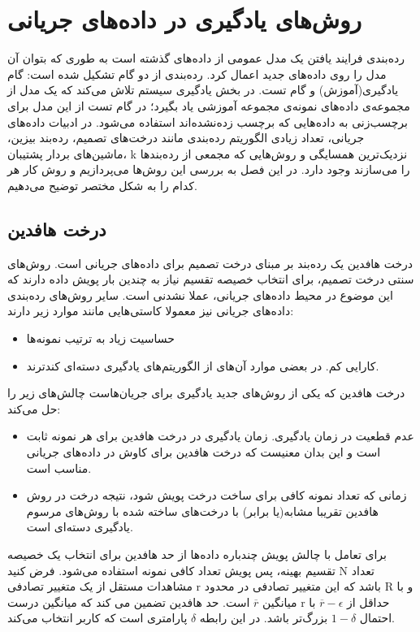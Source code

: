 
\chapter{روش‌های یادگیری در داده‌های جریانی}
\thispagestyle{empty}
رده‌بندی فرایند یافتن یک مدل عمومی از داده‌های گذشته است به طوری که بتوان آن مدل را روی داده‌های جدید اعمال کرد. رده‌بندی از دو گام تشکیل شده است: گام یادگیری(آموزش) و گام تست. در بخش یادگیری سیستم تلاش می‌کند که یک مدل از مجموعه‌ی داده‌های نمونه‌ی مجموعه آموزشی یاد بگیرد؛ در گام تست از این مدل برای برچسب‌زنی به داده‌هایی که برچسب زده‌نشده‌اند استفاده می‌شود. در ادبیات داده‌های جریانی، تعداد زیادی الگوریتم رده‌بندی مانند درخت‌های تصمیم، رده‌بند بیزین، ماشین‌های بردار پشتیبان، k نزدیک‌ترین همسایگی و روش‌هایی که مجمعی از رده‌بندها را می‌سازند وجود دارد. در این فصل به بررسی این روش‌ها می‌پردازیم و روش کار هر کدام را به شکل مختصر توضیح می‌دهیم.

\section{درخت هافدین}\label{sec3}
درخت هافدین یک رده‌بند بر مبنای درخت تصمیم برای داده‌های جریانی است\cite{gama2007learning}. روش‌های سنتی درخت تصمیم، برای انتخاب خصیصه تقسیم نیاز به چندین بار پویش داده دارند که این موضوع در محیط داده‌های جریانی، عملا نشدنی است. سایر روش‌های رده‌بندی داده‌های جریانی نیز معمولا کاستی‌هایی مانند موارد زیر دارند:


\begin{itemize}
\item حساسیت زیاد به ترتیب نمونه‌ها
\item کارایی کم. در بعضی موارد آن‌های از الگوریتم‌های یادگیری دسته‌ای کندترند.
\end{itemize}
درخت هافدین که یکی از روش‌های جدید یادگیری برای جریان‌هاست چالش‌های زیر را حل می‌کند:

\begin{itemize}
\item عدم قطعیت در زمان یادگیری. زمان یادگیری در درخت هافدین برای هر نمونه ثابت است و این بدان معنیست که درخت هافدین برای کاوش در داده‌های جریانی مناسب است.
\item زمانی که تعداد نمونه کافی برای ساخت درخت پویش شود، نتیجه درخت‌ در روش هافدین تقریبا مشابه(یا برابر) با درخت‌های ساخته شده با روش‌های مرسوم یادگیری دسته‌ای است.
\end{itemize}

برای تعامل با چالش پویش چندباره داده‌ها از حد هافدین برای انتخاب یک خصیصه تقسیم بهینه، پس پویش تعداد کافی نمونه استفاده می‌شود. فرض کنید N تعداد مشاهدات مستقل از یک متغییر تصادفی r باشد که این متغییر تصادفی در محدود R و با میانگین $ \overline{r} $ است. حد هافدین تضمین می کند که میانگین درست r حداقل از $ \overline{r} -\epsilon $ با احتمال $ 1 - \delta $ بزرگ‌تر باشد. در این رابطه $ \delta $ پارامتری است که کاربر انتخاب می‌کند.

